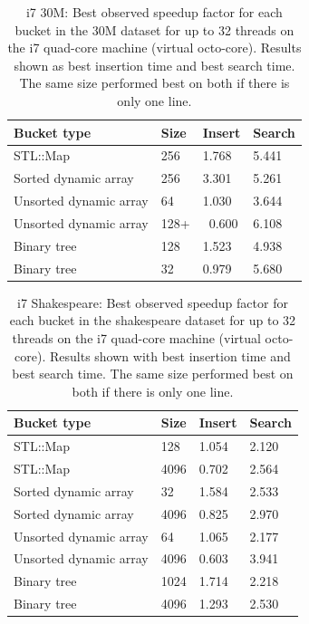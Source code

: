 \begin{table}[h]
    \centering
    \begin{tabular}[here]{ l l l l }
    \hline
        Bucket type            & Size & Insert & Search\\\hline
        STL::Map               & 256  & 1.768  & 5.441\\
        Sorted dynamic array   & 256  & 3.301  & 5.261\\
        Unsorted dynamic array & 64   & 1.030  & 3.644\\
        Unsorted dynamic array & 128+ & ~0.600 & 6.108\\
        Binary tree            & 128  & 1.523  & 4.938\\
        Binary tree            & 32   & 0.979  & 5.680\\
    \hline
    \end{tabular}
    \caption{i7 30M: Best observed speedup factor for each bucket in the 30M
    dataset for up to 32 threads on the i7 quad-core machine (virtual
    octo-core). Results shown as best insertion time and best search time. The
    same size performed best on both if there is only one line.}
    \label{tab:speedups_30m_i7}
\end{table}
\begin{table}[h]
    \centering
    \begin{tabular}[here]{ l l l l }
    \hline
        Bucket type            & Size & Insert & Search\\\hline
        STL::Map               & 128  & 1.054  & 2.120\\
        STL::Map               & 4096 & 0.702  & 2.564\\
        Sorted dynamic array   & 32   & 1.584  & 2.533\\
        Sorted dynamic array   & 4096 & 0.825  & 2.970\\
        Unsorted dynamic array & 64   & 1.065  & 2.177\\
        Unsorted dynamic array & 4096 & 0.603  & 3.941\\
        Binary tree            & 1024 & 1.714  & 2.218\\
        Binary tree            & 4096 & 1.293  & 2.530\\
    \hline
    \end{tabular}
    \caption{i7 Shakespeare: Best observed speedup factor for each bucket in
    the shakespeare dataset for up to 32 threads on the i7 quad-core machine
    (virtual octo-core). Results shown with best insertion time and best search
    time. The same size performed best on both if there is only one line.}
    \label{tab:speedups_shsp_i7}
\end{table}

